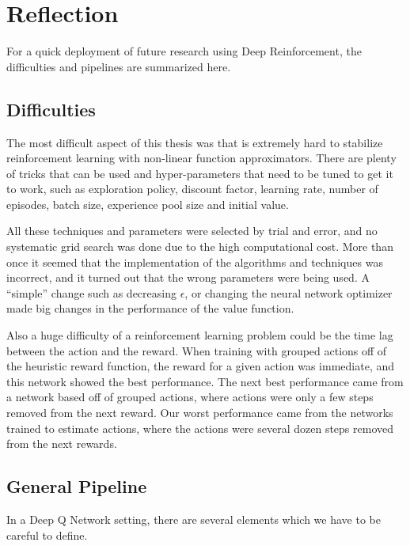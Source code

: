 \section{Reflection}

For a quick deployment of future research using Deep Reinforcement, the difficulties and pipelines are summarized here.

\subsection{Difficulties}

The most difficult aspect of this thesis was that is extremely hard to stabilize reinforcement learning with non-linear function approximators. There are plenty of tricks that can be used and hyper-parameters that need to be tuned to get it to work, such as exploration policy, discount factor, learning rate, number of episodes, batch size, experience pool size and initial value.

All these techniques and parameters were selected by trial and error, and no systematic grid search was done due to the high computational cost. More than once it seemed that the implementation of the algorithms and techniques was incorrect, and it turned out that the wrong parameters were being used. A ``simple'' change such as decreasing $\epsilon$, or changing the neural network optimizer made big changes in the performance of the value function.

Also a huge difficulty of a reinforcement learning problem could be the time lag between the action and the reward. When training with grouped actions off of the heuristic reward function, the reward for a given action was immediate, and this network showed the best performance. The next best performance came from a network based off of grouped actions, where actions were only a few steps removed from the next reward. Our worst performance came from the networks trained to estimate actions, where the actions were several dozen steps removed from the next rewards.

\subsection{General Pipeline}

In a Deep Q Network setting, there are several elements which we have to be careful to define.

